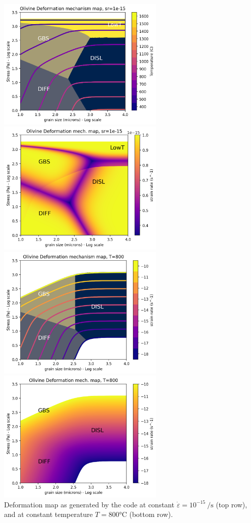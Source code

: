 \begin{center}
\includegraphics[width=8cm]{python_codes/fieldstone_121/results/constant_strainrate_deformation_map1.png}
\includegraphics[width=8cm]{python_codes/fieldstone_121/results/constant_strainrate_deformation_map2.png}\\
\includegraphics[width=8cm]{python_codes/fieldstone_121/results/constant_temperature_deformation_map3.png}
\includegraphics[width=8cm]{python_codes/fieldstone_121/results/constant_temperature_deformation_map4.png}\\
{\captionfont Deformation map as generated by the code at constant $\dot\varepsilon=10^{-15}~\si{\per\second}$ (top row),
and at constant temperature $T=800\si{\celsius}$ (bottom row).}
\end{center}


